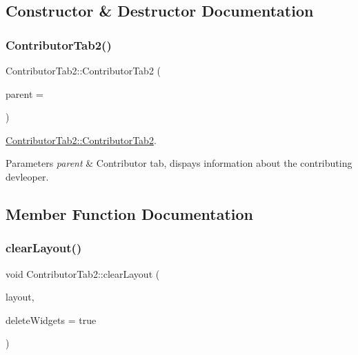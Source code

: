 \subsection{Constructor \& Destructor Documentation}
\mbox{\label{classContributorTab2_afb63f19687c265fe4fc325040cc2d8d7}} 
\subsubsection{\texorpdfstring{Contributor\+Tab2()}{ContributorTab2()}}
{\footnotesize\ttfamily Contributor\+Tab2\+::\+Contributor\+Tab2 (\begin{DoxyParamCaption}\item[{Q\+Widget $\ast$}]{parent = {} }\end{DoxyParamCaption})}



\hyperlink{classContributorTab2_afb63f19687c265fe4fc325040cc2d8d7}{Contributor\+Tab2\+::\+Contributor\+Tab2}. 


\begin{DoxyParams}{Parameters}
{\em parent} & Contributor tab, dispays information about the contributing devleoper. \\
\hline
\end{DoxyParams}


\subsection{Member Function Documentation}
\mbox{\label{classContributorTab2_a7bc323cf603d03913d96ade9536d8f7e}} 
\subsubsection{\texorpdfstring{clear\+Layout()}{clearLayout()}}
{\footnotesize\ttfamily void Contributor\+Tab2\+::clear\+Layout (\begin{DoxyParamCaption}\item[{Q\+Layout $\ast$}]{layout,  }\item[{bool}]{delete\+Widgets = {\ttfamily true} }\end{DoxyParamCaption})\hspace{0.3cm}{\ttfamily [protected]}}



